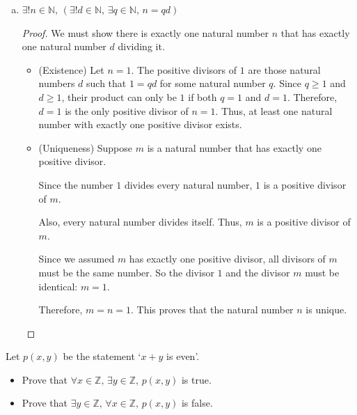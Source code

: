 \begin{solutions*}
\begin{enumerate}[(a)]
\begin{proof}
\begin{itemize}
            \[x'^2 = 0 \quad \text{and} \quad b^2 = 0\]
            Therefore, $b = a = 0$. This proves that the real number $a$ is unique.
        \end{itemize}
    \end{proof}
    \item $\exists! n \in \mathbb{N},\, (\exists! d \in \mathbb{N},\, \exists q \in \mathbb{N},\, n = qd)$
    \begin{proof}
        We must show there is exactly one natural number $n$ that has exactly one natural number $d$ dividing it.
        \begin{itemize}
            \item (Existence) Let $n = 1$. The positive divisors of $1$ are those natural numbers $d$ such that $1 = qd$ for some natural number $q$. Since $q \ge 1$ and $d \ge 1$, their product can only be $1$ if both $q = 1$ and $d = 1$. Therefore, $d=1$ is the only positive divisor of $n=1$. Thus, at least one natural number with exactly one positive divisor exists.
            \item (Uniqueness) Suppose $m$ is a natural number that has exactly one positive divisor.
            
            Since the number $1$ divides every natural number, $1$ is a positive divisor of $m$.

            Also, every natural number divides itself. Thus, $m$ is a positive divisor of $m$.

            Since we assumed $m$ has exactly one positive divisor, all divisors of $m$ must be the same number. So the divisor $1$ and the divisor $m$ must be identical: $m=1$.

            Therefore, $m = n = 1$. This proves that the natural number $n$ is unique.
        \end{itemize}
    \end{proof}
    \end{enumerate}
\end{solutions*}

\begin{exercise}
Let $p(x,y)$ be the statement `$x + y$ is even'.
\begin{itemize}
\item Prove that $\forall x \in \mathbb{Z},\, \exists y \in \mathbb{Z},\, p(x,y)$ is true.
\item Prove that $\exists y \in \mathbb{Z},\, \forall x \in \mathbb{Z},\, p(x,y)$ is false.
\end{itemize}
\end{exercise}

